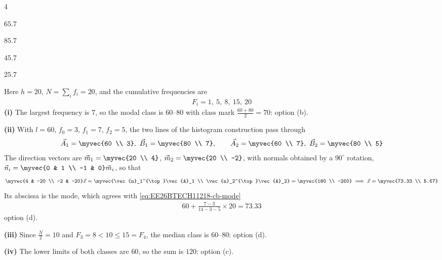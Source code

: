 \begin{enumerate}[label=\thesubsection.\arabic*, ref=\thesubsection.\theenumi,itemsep=1.5em]
\begin{enumerate}[label=(\roman*), itemsep=0pt]
\begin{enumerate}[label=\alph*), itemsep=0pt]
    \begin{multicols}{4}
        \item $65.7$
        \item $85.7$
        \item $45.7$
        \item $25.7$
    \end{multicols}
\end{enumerate}
\end{enumerate}
\solution
Here $h=20$, $N=\sum_i f_i = 20$, and the cumulative frequencies are
\begin{align}
F_i = 1,\ 5,\ 8,\ 15,\ 20
\end{align}
\textbf{(i)} The largest frequency is $7$, so the modal class is $60$--$80$ with class mark $\frac{60+80}{2}=70$: option (b).

\textbf{(ii)} With $l=60$, $f_0=3$, $f_1=7$, $f_2=5$, the two lines of the histogram construction pass through
\begin{align}
\vec{A}_1 = \myvec{60 \\ 3},\ \vec{B}_1 = \myvec{80 \\ 7}, \qquad \vec{A}_2 = \myvec{60 \\ 7},\ \vec{B}_2 = \myvec{80 \\ 5}
\end{align}
The direction vectors are $\vec{m}_1 = \myvec{20 \\ 4}$, $\vec{m}_2 = \myvec{20 \\ -2}$, with normals obtained by a $90^{\circ}$ rotation, $\vec{n}_i = \myvec{0 & 1 \\ -1 & 0}\vec{m}_i$, so that
\begin{align}
\myvec{4 & -20 \\ -2 & -20}\vec{x} = \myvec{\vec{n}_1^{\top}\vec{A}_1 \\ \vec{n}_2^{\top}\vec{A}_2} = \myvec{180 \\ -260}
\implies \vec{x} = \myvec{73.33 \\ 5.67}
\end{align}
Its abscissa is the mode, which agrees with \eqref{eq:EE26BTECH11218-cb-mode}
\begin{align}
60 + \frac{7-3}{14-3-5}\times 20 = 73.33
\end{align}
option (d).

\textbf{(iii)} Since $\frac{N}{2}=10$ and $F_3 = 8 < 10 \le 15 = F_4$, the median class is $60$--$80$: option (d).

\textbf{(iv)} The lower limits of both classes are $60$, so the sum is $120$: option (c).


\end{enumerate}
